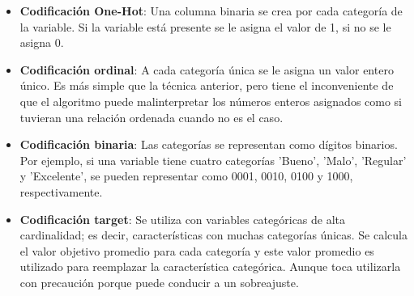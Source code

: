 \begin{itemize}
    \item \textbf{Codificación One-Hot}: Una columna binaria se crea por cada categoría de la variable. Si la variable está presente se le asigna el valor de 1, si no se le asigna 0.

    \item \textbf{Codificación ordinal}: A cada categoría única se le asigna un valor entero único. Es más simple que la técnica anterior, pero tiene el inconveniente de que el algoritmo puede malinterpretar los números enteros asignados como si tuvieran una relación ordenada cuando no es el caso.

    \item \textbf{Codificación binaria}:  Las categorías se representan como dígitos binarios. Por ejemplo, si una variable tiene cuatro categorías  'Bueno',  'Malo',  'Regular'  y  'Excelente', se pueden representar como  0001, 0010, 0100 y 1000, respectivamente.

    \item \textbf{Codificación target}: Se utiliza con variables categóricas de alta cardinalidad; es decir, características con  muchas categorías únicas. Se calcula el valor objetivo promedio para cada categoría  y este valor promedio es utilizado para reemplazar la característica categórica.  Aunque toca utilizarla con precaución porque puede conducir a un sobreajuste.
\end{itemize}